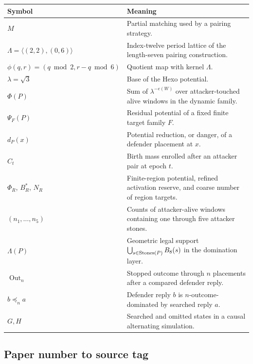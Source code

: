 \begin{appendixtable}
  \label{tab:notation-other}
  \small
  \renewcommand{\arraystretch}{1.08}
  \begin{tabular}{@{}p{}p{}@{}}
    \toprule
    Symbol & Meaning \\
    \midrule
    $M$ & Partial matching used by a pairing strategy. \\
    $\Lambda=\langle(2,2),(0,6)\rangle$ & Index-twelve period lattice of the
      length-seven pairing construction. \\
    $\phi(q,r)=(q\bmod2,r-q\bmod6)$ & Quotient map with kernel $\Lambda$. \\
    $\lambda=\sqrt3$ & Base of the Hexo potential. \\
    $\Phi(P)$ & Sum of $\lambda^{-e(W)}$ over attacker-touched alive windows
      in the dynamic family. \\
    $\Psi_F(P)$ & Residual potential of a fixed finite target family $F$. \\
    $d_P(x)$ & Potential reduction, or danger, of a defender placement at
      $x$. \\
    $C_t$ & Birth mass enrolled after an attacker pair at epoch $t$. \\
    $\Phi_R$, $B_R^*$, $N_R$ & Finite-region potential, refined activation
      reserve, and coarse number of region targets. \\
    $(n_1,\ldots,n_5)$ & Counts of attacker-alive windows containing one
      through five attacker stones. \\
    $\Lambda(P)$ & Geometric legal support
      $\bigcup_{s\in\operatorname{Stones}(P)}B_8(s)$ in the domination layer. \\
    $\operatorname{Out}_n$ & Stopped outcome through $n$ placements after a
      compared defender reply. \\
    $b\preceq_n a$ & Defender reply $b$ is $n$-outcome-dominated by searched
      reply $a$. \\
    $G,H$ & Searched and omitted states in a causal alternating simulation. \\
    \bottomrule
  \end{tabular}
\end{appendixtable}

\clearpage
\subsection{Paper number to source tag}


